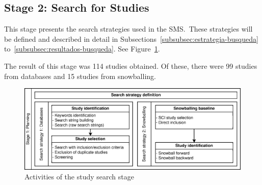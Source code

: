 \newcommand{\totalStudies}{114}
\newcommand{\databaseStudies}{99}
\newcommand{\snowballStudies}{15}
\newcommand{\directInclusionStudies}{0}



\subsection{Stage 2: Search for Studies}

This stage presents the search strategies used in the SMS.~These strategies will be defined and described in detail in Subsections~\ref{subsubsec:estrategia-busqueda} to~\ref{subsubsec:resultados-busqueda}. See Figure~\ref{fig:busqueda-estudios}.

The result of this stage was \totalStudies{} studies obtained. Of these, there were \databaseStudies{} studies from databases and \snowballStudies{} studies from snowballing.


\begin{figure}
	\centering
	\includegraphics[scale=0.8]{resources/figures/sms-Etapa-1-wide.eps}
	\caption{Activities of the study search stage}
	\label{fig:busqueda-estudios}
\end{figure}













